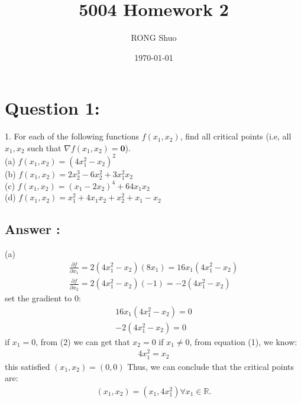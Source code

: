 \documentclass[a4paper,12pt]{article}
\newcommand{\R}{\mathbb{R}}
\begin{document}
\title{5004 Homework 2}
\author{RONG Shuo}
\date{\today}
\maketitle


\section*{Question 1:}
1. For each of the following functions \(f(x_1, x_2)\), find all critical points (i.e, all \(x_1, x_2\) such that \( \nabla f(x_1, x_2) = \bm{0}\)). \\

(a) \(f(x_1, x_2) = (4x_1^2 - x_2)^2\) \\
(b) \( f(x_1, x_2) = 2x_2^3 - 6x_2^2 + 3x_1^2x_2\) \\
(c) \(f(x_1, x_2) = (x_1 - 2x_2)^4 + 64x_1x_2\) \\
(d) \(f(x_1, x_2) = x_1^2 + 4x_1x_2 + x_2^2 + x_1 - x_2\) \\

\subsection*{Answer :}
(a)
\begin{align*}
    \frac{\partial f}{ \partial x_1} = 2(4x_1^2 - x_2)(8x_1) = 16x_1(4x_1^2 - x_2) \\
    \frac{\partial f}{ \partial x_2} = 2(4x_1^2 - x_2)(-1) = -2(4x_1^2 - x_2)
\end{align*}
set the gradient to 0:
\begin{align}
    16x_1(4x_1^2 - x_2) = 0 \\
    -2(4x_1^2 - x_2) = 0 
\end{align}
if \(x_1 = 0\), from (2) we can get that \(x_2 = 0\)
if \(x_1 \ne 0\), from equation (1), we know:
\begin{align*}
    4x_1^2 = x_2
\end{align*}
this satisfied \((x_1, x_2) = (0, 0)\)
Thus, we can conclude that the critical points are:
\begin{align*}
    (x_1, x_2) = (x_1, 4x_1^2) \forall x_1 \in \R.
\end{align*}
\end{document}
